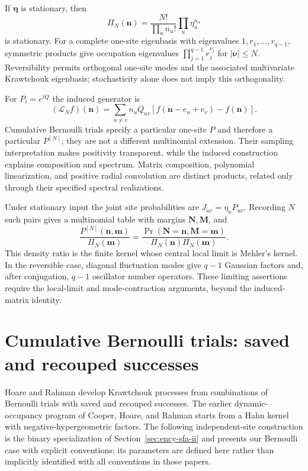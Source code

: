 If $\boldsymbol\eta$ is stationary, then
\[
\Pi_N(\mathbf n)=\frac{N!}{\prod_u n_u!}\prod_u\eta_u^{n_u}
\]
is stationary. For a complete one-site eigenbasis with eigenvalues
$1,r_1,\ldots,r_{q-1}$, symmetric products give occupation eigenvalues
$\prod_{j=1}^{q-1}r_j^{\nu_j}$ for $|\boldsymbol\nu|\le N$.
Reversibility permits orthogonal one-site modes and the associated
multivariate Krawtchouk eigenbasis; stochasticity alone does not imply
this orthogonality.

For $P_t=e^{tQ}$ the induced generator is
\[
(\mathcal L_Nf)(\mathbf n)=\sum_{u\ne v}n_uQ_{uv}
[f(\mathbf n-e_u+e_v)-f(\mathbf n)].
\]
Cumulative Bernoulli trials specify a particular one-site $P$ and
therefore a particular $P^{[N]}$; they are not a different multinomial
extension. Their sampling interpretation makes positivity transparent,
while the induced construction explains composition and spectrum.
Matrix composition, polynomial linearization, and positive radial
convolution are distinct products, related only through their specified
spectral realizations.

Under stationary input the joint site probabilities are
$J_{uv}=\eta_uP_{uv}$. Recording $N$ such pairs gives a multinomial table
with margins $\mathbf N,\mathbf M$, and
\[
\frac{P^{[N]}(\mathbf n,\mathbf m)}{\Pi_N(\mathbf m)}
=\frac{\Pr(\mathbf N=\mathbf n,\mathbf M=\mathbf m)}
{\Pi_N(\mathbf n)\Pi_N(\mathbf m)}.
\]
This density ratio is the finite kernel whose central local limit is
Mehler's kernel. In the reversible case, diagonal fluctuation modes
give $q-1$ Gaussian factors and, after conjugation, $q-1$ oscillator
number operators. These limiting assertions require the local-limit
and mode-contraction arguments, beyond the induced-matrix identity.

\section{Cumulative Bernoulli trials: saved and recouped successes}
\label{sec:cumulative-bernoulli}
Hoare and Rahman \cite{HoareRahman1984} develop Krawtchouk processes
from combinations of Bernoulli trials with saved and recouped successes.
The earlier dynamic-occupancy program of Cooper, Hoare, and Rahman
\cite{CooperHoareRahman1977} starts from a Hahn kernel with
negative-hypergeometric factors. The following independent-site
construction is the binary specialization of Section~\ref{sec:ency-sfa-ii}
and presents our Bernoulli case with explicit conventions;
its parameters are defined here rather than implicitly identified with
all conventions in those papers.

